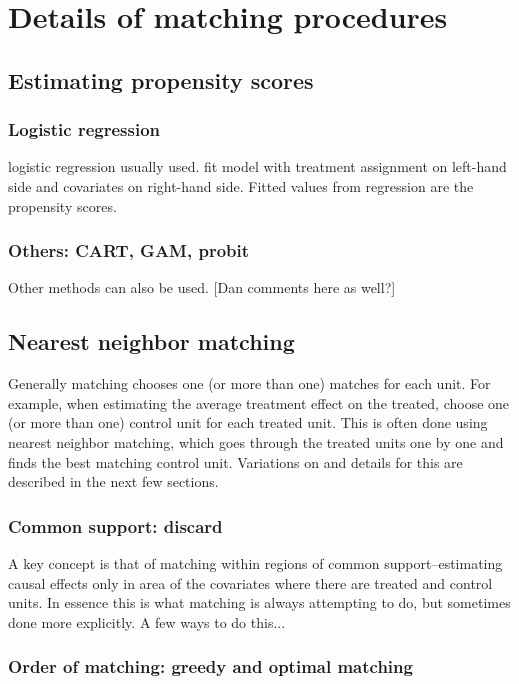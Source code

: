 \documentclass[11pt,titlepage]{article}
\begin{document}
                                                                                                                                                             
\section{Details of matching procedures}
\subsection{Estimating propensity scores}
\subsubsection{Logistic regression}
logistic regression usually used.  fit model with treatment assignment on left-hand side and covariates on right-hand side.
Fitted values from regression are the propensity scores.

\subsubsection{Others: CART, GAM, probit}
Other methods can also be used.  [Dan comments here as well?]

\subsection{Nearest neighbor matching}
Generally matching chooses one (or more than one) matches for each unit.  For example, when estimating the average treatment effect
on the treated, choose one (or more than one) control unit for each treated unit.  This is often done using nearest neighbor matching,
which goes through the treated units one by one and finds the best matching control unit.  Variations on and details for this are described in the next few sections.

\subsubsection{Common support: discard}
A key concept is that of matching within regions of common support--estimating causal effects only in area of the covariates where
there are treated and control units.  In essence this is what matching is always attempting to do, but sometimes done more explicitly.
A few ways to do this...

\subsubsection{Order of matching: greedy and optimal matching}
\end{document}

